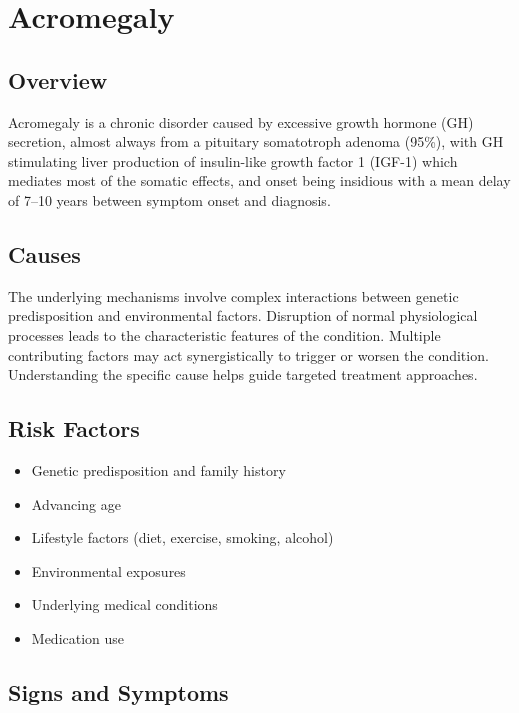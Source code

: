 \chapter{Acromegaly}
\label{sec:Acromegaly}

\section{Overview}
Acromegaly is a chronic disorder caused by excessive growth hormone (GH) secretion, almost always from a pituitary somatotroph adenoma (95\%), with GH stimulating liver production of insulin-like growth factor 1 (IGF-1) which mediates most of the somatic effects, and onset being insidious with a mean delay of 7--10 years between symptom onset and diagnosis.
\section{Causes}
The underlying mechanisms involve complex interactions between genetic predisposition and environmental factors. Disruption of normal physiological processes leads to the characteristic features of the condition. Multiple contributing factors may act synergistically to trigger or worsen the condition. Understanding the specific cause helps guide targeted treatment approaches.
\section{Risk Factors}


\begin{itemize}[noitemsep]
  \item Genetic predisposition and family history
  \item Advancing age
  \item Lifestyle factors (diet, exercise, smoking, alcohol)
  \item Environmental exposures
  \item Underlying medical conditions
  \item Medication use
\end{itemize}
\section{Signs and Symptoms}


